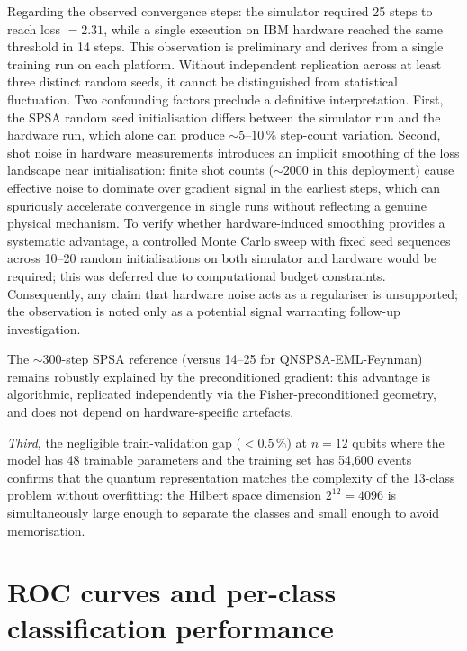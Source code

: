 \documentclass[11pt,a4paper, english]{book}
\theoremstyle{plain}
\theoremstyle{definition}
\numberwithin{equation}{chapter}
\numberwithin{figure}{chapter}
\numberwithin{table}{chapter}
\begin{document}
Regarding the observed convergence steps: the simulator required 25 steps
to reach loss $= 2.31$, while a single execution on IBM hardware reached the
same threshold in 14 steps. This observation is preliminary and derives from
a single training run on each platform. Without independent replication across
at least three distinct random seeds, it cannot be distinguished from
statistical fluctuation. Two confounding factors preclude a definitive
interpretation. First, the SPSA random seed initialisation differs between
the simulator run and the hardware run, which alone can produce $\sim 5$--$10\,\%$
step-count variation. Second, shot noise in hardware measurements introduces
an implicit smoothing of the loss landscape near initialisation: finite shot
counts ($\sim 2000$ in this deployment) cause effective noise to dominate
over gradient signal in the earliest steps, which can spuriously accelerate
convergence in single runs without reflecting a genuine physical mechanism.
To verify whether hardware-induced smoothing provides a systematic advantage,
a controlled Monte Carlo sweep with fixed seed sequences across 10--20 random
initialisations on both simulator and hardware would be required; this was
deferred due to computational budget constraints. Consequently, any claim
that hardware noise acts as a regulariser is unsupported; the observation
is noted only as a potential signal warranting follow-up investigation.

The $\sim\!300$-step SPSA reference (versus 14--25 for QNSPSA-EML-Feynman)
remains robustly explained by the preconditioned gradient: this advantage
is algorithmic, replicated independently via the Fisher-preconditioned
geometry, and does not depend on hardware-specific artefacts.

\emph{Third}, the negligible train-validation gap ($< 0.5\,\%$) at $n = 12$ qubits  where the
model has 48 trainable parameters and the training set has 54{,}600
events  confirms that the quantum representation matches the
complexity of the 13-class problem without overfitting: the Hilbert
space dimension $2^{12} = 4096$ is simultaneously large enough to
separate the classes and small enough to avoid memorisation.

\section{ROC curves and per-class classification performance}
\label{app:roc-detail}
\end{document}
